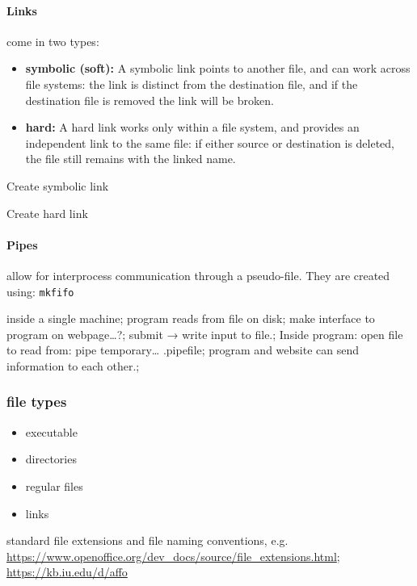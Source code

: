 \documentclass{article}
\begin{document}
\paragraph{Links} come in two types:
\begin{itemize}
    \item {\bf symbolic (soft):}
        A symbolic link points to another file, and
        can work across file systems: the link is distinct from the
        destination file, and if the destination file is removed the link will
        be broken.
    \item {\bf hard:}
        A hard link works only within a file system, and provides
        an independent link to the same file: if either source or destination
        is deleted, the file still remains with the linked name.
\end{itemize}
\begin{description}[labelwidth=17em]
    \item [> ln -s \{source\} \{destination\}] Create symbolic link
    \item [> ln \{source\} \{destination\}] Create hard link
\end{description}

\paragraph{Pipes} allow for interprocess communication through a pseudo-file.
They are created using: \verb|mkfifo|

\textcolor{myGreen}{inside a single machine;
program reads from file on disk;
make interface to program on webpage…?;
submit → write input to file.;
Inside program: open file to read from: pipe temporary… .pipefile;
program and website can send information to each other.;
}

\subsubsection{file types}
\begin{itemize}
    \item executable
    \item directories
    \item regular files
    \item links
\end{itemize}

standard file extensions and file naming conventions, e.g.
\url{https://www.openoffice.org/dev_docs/source/file_extensions.html};
\url{https://kb.iu.edu/d/affo}
\end{document}
